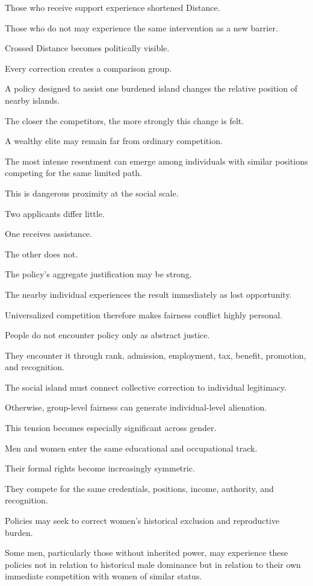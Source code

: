 Those who receive support experience shortened Distance.

Those who do not may experience the same intervention as a new barrier.

Crossed Distance becomes politically visible.

Every correction creates a comparison group.

A policy designed to assist one burdened island changes the relative position of nearby islands.

The closer the competitors, the more strongly this change is felt.

A wealthy elite may remain far from ordinary competition.

The most intense resentment can emerge among individuals with similar positions competing for the same limited path.

This is dangerous proximity at the social scale.

Two applicants differ little.

One receives assistance.

The other does not.

The policy’s aggregate justification may be strong.

The nearby individual experiences the result immediately as lost opportunity.

Universalized competition therefore makes fairness conflict highly personal.

People do not encounter policy only as abstract justice.

They encounter it through rank, admission, employment, tax, benefit, promotion, and recognition.

The social island must connect collective correction to individual legitimacy.

Otherwise, group-level fairness can generate individual-level alienation.

This tension becomes especially significant across gender.

Men and women enter the same educational and occupational track.

Their formal rights become increasingly symmetric.

They compete for the same credentials, positions, income, authority, and recognition.

Policies may seek to correct women’s historical exclusion and reproductive burden.

Some men, particularly those without inherited power, may experience these policies not in relation to historical male dominance but in relation to their own immediate competition with women of similar status.

